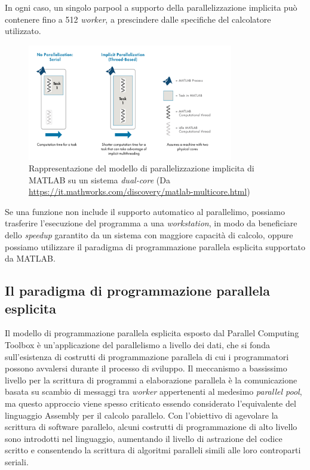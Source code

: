 In ogni caso, un singolo parpool a supporto della parallelizzazione implicita pu\`o contenere fino a 512 \textit{worker}, a prescindere dalle specifiche 
del calcolatore utilizzato.
\begin{figure}[htbp]
    \centering
    \includegraphics[width=0.8\textwidth]{../Immagini/Capitolo 2/ImplicitParallelization.png}
    \caption{Rappresentazione del modello di parallelizzazione implicita di MATLAB su un sistema \textit{dual-core}
    \small{(Da \url{https://it.mathworks.com/discovery/matlab-multicore.html})}}
    \label{fig:ParallelismoImplicito}
\end{figure}\newline
Se una funzione non include il supporto automatico al parallelimo, possiamo trasferire l'esecuzione del programma a una \textit{workstation}, in modo da beneficiare 
dello \textit{speedup} garantito da un sistema con maggiore capacit\`a di calcolo, oppure possiamo utilizzare il paradigma di programmazione parallela esplicita 
supportato da MATLAB.

\subsection{Il paradigma di programmazione parallela esplicita}

Il modello di programmazione parallela esplicita esposto dal Parallel Computing Toolbox \`e un'applicazione del parallelismo a livello dei dati, che si fonda sull'esistenza di costrutti di programmazione 
parallela di cui i programmatori possono avvalersi durante il processo di sviluppo.\newline
Il meccanismo a bassissimo livello per la scrittura di programmi a elaborazione parallela \`e la comunicazione basata su scambio di messaggi tra \textit{worker} 
appertenenti al medesimo \textit{parallel pool}, ma questo approccio viene spesso criticato essendo considerato l'equivalente del linguaggio 
Assembly per il calcolo parallelo.\newline
Con l'obiettivo di agevolare la scrittura di software parallelo, alcuni costrutti di programmazione di alto livello sono introdotti nel linguaggio, aumentando il livello di 
astrazione del codice scritto e consentendo la scrittura di algoritmi paralleli simili alle loro controparti seriali.


